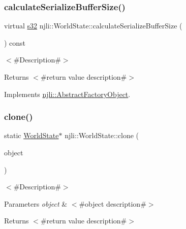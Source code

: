 \subsubsection{\texorpdfstring{calculate\+Serialize\+Buffer\+Size()}{calculateSerializeBufferSize()}}
{\footnotesize\ttfamily virtual \mbox{\hyperlink{_util_8h_aa62c75d314a0d1f37f79c4b73b2292e2}{s32}} njli\+::\+World\+State\+::calculate\+Serialize\+Buffer\+Size (\begin{DoxyParamCaption}{ }\end{DoxyParamCaption}) const\hspace{0.3cm}{\ttfamily [virtual]}}

$<$\#\+Description\#$>$

\begin{DoxyReturn}{Returns}
$<$\#return value description\#$>$ 
\end{DoxyReturn}


Implements \mbox{\hyperlink{classnjli_1_1_abstract_factory_object_a4763d05bc9dc37c559111f8bb30e1dd8}{njli\+::\+Abstract\+Factory\+Object}}.

\mbox{\label{classnjli_1_1_world_state_a4ba8555951541584e30d1017f3f67a6c}} 
\subsubsection{\texorpdfstring{clone()}{clone()}}
{\footnotesize\ttfamily static \mbox{\hyperlink{classnjli_1_1_world_state}{World\+State}}$\ast$ njli\+::\+World\+State\+::clone (\begin{DoxyParamCaption}\item[{const \mbox{\hyperlink{classnjli_1_1_world_state}{World\+State}} \&}]{object }\end{DoxyParamCaption})\hspace{0.3cm}{\ttfamily [static]}}

$<$\#\+Description\#$>$


\begin{DoxyParams}{Parameters}
{\em object} & $<$\#object description\#$>$\\
\hline
\end{DoxyParams}
\begin{DoxyReturn}{Returns}
$<$\#return value description\#$>$ 
\end{DoxyReturn}
\mbox{\label{classnjli_1_1_world_state_a626f51bba8f527cfeaafdfa39ad02a5e}} 
